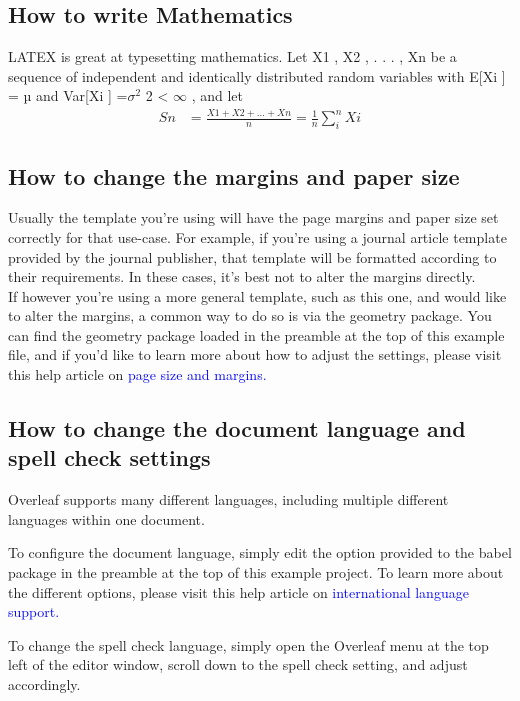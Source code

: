 \documentclass{article}
\begin{document}
   \subsection{How to write Mathematics}
    LATEX is great at typesetting mathematics. Let X1 , X2 , . . . , Xn be a sequence of independent and
    identically distributed random variables with E[Xi ] = µ and Var[Xi ] =$\sigma^2$  2 < $\infty$ , and let\\
    
    \begin{align*}
    	Sn &=\frac{X1+X2+...+Xn}{n}=\frac{1}{n}\sum_{i}^{n} {Xi}    \end{align*}
    

    \subsection{How to change the margins and paper size}
    Usually the template you’re using will have the page margins and paper size set correctly for that use-case. For example, if you’re using a journal article template provided by the journal publisher, that template will be formatted according to their requirements. In these cases, it’s best not to alter the margins directly.\\
    \hspace{1cm}If however you’re using a more general template, such as this one, and would like to alter the margins, a common way to do so is via the geometry package. You can find the geometry package loaded in the preamble at the top of this example file, and if you’d like to learn more about how to adjust the settings, please visit this help article on \textcolor{blue}{page size and margins.}
    
    \subsection{How to change the document language and spell check settings}
    Overleaf supports many different languages, including multiple different languages within one document.
    
    \hspace{1cm}To configure the document language, simply edit the option provided to the babel package in the
    preamble at the top of this example project. To learn more about the different options, please visit
    this help article on \textcolor{blue}{international language support.}
    
    \hspace{1cm}To change the spell check language, simply open the Overleaf menu at the top left of the editor
    window, scroll down to the spell check setting, and adjust accordingly.
\end{document}
